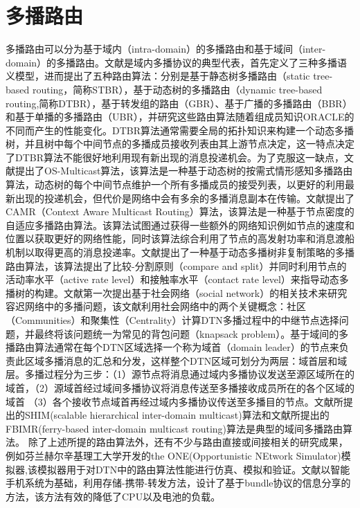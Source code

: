 \section{多播路由}
多播路由可以分为基于域内（intra-domain）的多播路由和基于域间（inter-domain）的多播路由。文献是域内多播协议的典型代表，首先定义了三种多播语义模型，进而提出了五种路由算法：分别是基于静态树多播路由（static tree-based routing，简称STBR），基于动态树的多播路由（dynamic tree-based routing,简称DTBR），基于转发组的路由（GBR）、基于广播的多播路由（BBR）和基于单播的多播路由（UBR），并研究这些路由算法随着组成员知识ORACLE的不同而产生的性能变化。DTBR算法通常需要全局的拓扑知识来构建一个动态多播树，并且树中每个中间节点的多播成员接收列表由其上游节点决定，这一特点决定了DTBR算法不能很好地利用现有新出现的消息投递机会。为了克服这一缺点，文献提出了OS-Multicast算法，该算法是一种基于动态树的按需式情形感知多播路由算法，动态树的每个中间节点维护一个所有多播成员的接受列表，以更好的利用最新出现的投递机会，但代价是网络中会有多余的多播消息副本在传输。文献提出了CAMR（Context Aware Multicast Routing）算法，该算法是一种基于节点密度的自适应多播路由算法。该算法试图通过获得一些额外的网络知识例如节点的速度和位置以获取更好的网络性能，同时该算法综合利用了节点的高发射功率和消息渡船机制以取得更高的消息投递率。文献提出了一种基于动态多播树非复制策略的多播路由算法，该算法提出了比较-分割原则（compare and split）并同时利用节点的活动率水平（active rate level）和接触率水平（contact rate level）来指导动态多播树的构建。文献第一次提出基于社会网络（social network）的相关技术来研究容迟网络中的多播问题，该文献利用社会网络中的两个关键概念：社区（Communities）和聚集性（Centrality）计算DTN多播过程中的中继节点选择问题，并最终将该问题统一为常见的背包问题（knapsack problem）。基于域间的多播路由算法通常在每个DTN区域选择一个称为域首（domain leader）的节点来负责此区域多播消息的汇总和分发，这样整个DTN区域可划分为两层：域首层和域层。多播过程分为三步：（1）源节点将消息通过域内多播协议发送至源区域所在的域首，（2）源域首经过域间多播协议将消息传送至多播接收成员所在的各个区域的域首 （3）各个接收节点域首再经过域内多播协议传送至多播目的节点。文献所提出的SHIM(scalable hierarchical inter-domain multicast)算法和文献所提出的FBIMR(ferry-based inter-domain multicast routing)算法是典型的域间多播路由算法。
除了上述所提的路由算法外，还有不少与路由直接或间接相关的研究成果，例如芬兰赫尔辛基理工大学开发的the ONE(Opportunistic NEtwork Simulator)模拟器,该模拟器用于对DTN中的路由算法性能进行仿真、模拟和验证。文献以智能手机系统为基础，利用存储-携带-转发方法，设计了基于bundle协议的信息分享的方法，该方法有效的降低了CPU以及电池的负载。

